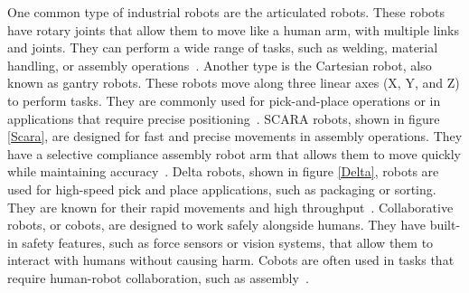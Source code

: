 One common type of industrial robots are the articulated robots. These robots have rotary joints that allow them to move like a human arm, with multiple links and joints. They can perform a wide range of tasks, such as welding, material handling, or assembly operations~\cite{Hanafusa.1981, Jain.2019}. Another type is the Cartesian robot, also known as gantry robots. These robots move along three linear axes (X, Y, and Z) to perform tasks. They are commonly used for pick-and-place operations or in applications that require precise positioning~\cite{Kim.2003}. SCARA robots, shown in figure \ref{Scara}, are designed for fast and precise movements in assembly operations. They have a selective compliance assembly robot arm that allows them to move quickly while maintaining accuracy~\cite{Das.2005}. Delta robots, shown in figure \ref{Delta}, robots are used for high-speed pick and place applications, such as packaging or sorting. They are known for their rapid movements and high throughput~\cite{bonev2001delta}. Collaborative robots, or cobots, are designed to work safely alongside humans. They have built-in safety features, such as force sensors or vision systems, that allow them to interact with humans without causing harm. Cobots are often used in tasks that require human-robot collaboration, such as assembly~\cite{Liu.2022b}.



